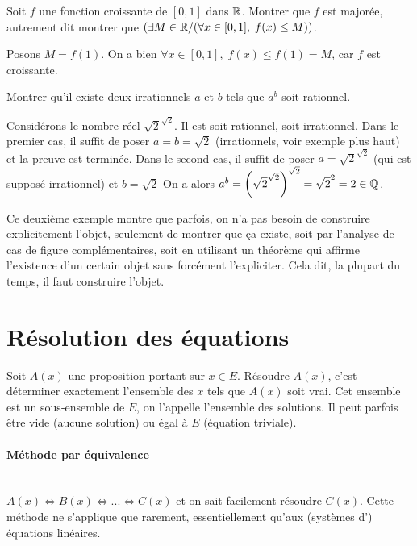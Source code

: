\begin{exemple}
Soit $f$ une fonction croissante de $[0,1]$ dans $\mathbb{R}$. Montrer que $f$ est majorée, autrement dit montrer que $(\exists M\in\mathbb{R}\slash (\forall x\in[0,1],\;f(x)\leq M))$.
\begin{red}
Posons $M = f(1)$. On a bien $\forall x\in[0,1],\;f(x)\leq f(1)= M$, car $f$ est croissante.
\end{red}
\end{exemple}

\begin{exemple}
Montrer qu'il existe deux irrationnels $a$ et $b$ tels que $a^b$ soit rationnel.
\begin{red}
Considérons le nombre réel $\sqrt{2}^{\sqrt{2}}$. Il est soit rationnel, soit irrationnel. Dans le premier cas, il suffit de poser $a=b=\sqrt{2}$ (irrationnels, voir exemple plus haut) et la preuve est terminée. Dans le second cas, il suffit de poser $a=\sqrt{2}^{\sqrt{2}}$ (qui est supposé irrationnel) et $b=\sqrt{2}$ On a alors $a^b = \left(\sqrt{2}^{\sqrt{2}}\right)^{\sqrt{2}} = \sqrt{2}^2 = 2 \in \mathbb{Q}$.
\end{red}
\end{exemple}

Ce deuxième exemple montre que parfois, on n'a pas besoin de construire explicitement l'objet, seulement de montrer que ça existe, soit par l'analyse de cas de figure complémentaires, soit en utilisant un théorème qui affirme l'existence d'un certain objet sans forcément l'expliciter. Cela dit, la plupart du temps, il faut construire l'objet.


\section{Résolution des équations}

Soit $A(x)$ une proposition portant sur $x\in E$. Résoudre $A(x)$, c'est déterminer exactement l'ensemble des $x$ tels que $A(x)$ soit vrai. Cet ensemble est un sous-ensemble de $E$, on l'appelle l'ensemble des solutions. Il peut parfois être vide (aucune solution) ou égal à $E$ (équation triviale).


\paragraph{Méthode par équivalence}$ $\\
$A(x) \iff B(x) \iff ... \iff C(x)$ et on sait facilement résoudre $C(x)$. Cette méthode ne  s'applique que rarement, essentiellement qu'aux (systèmes d') équations linéaires.

